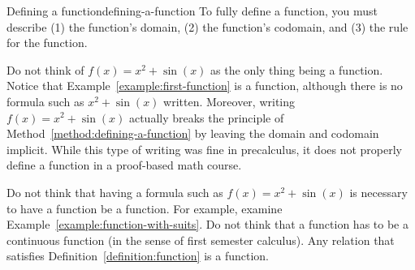 \documentclass{book}
\theoremstyle{ekimcustom}
\begin{document}
\begin{bmethod}{Defining a function}{defining-a-function}
To fully define a function, you must describe (1) the function's domain, (2) the function's codomain, and (3) the rule for the function.
\end{bmethod}
\begin{bwarning}{}{}
Do not think of $f(x)=x^2+\sin(x)$ as the only thing being a function. Notice that Example~\ref{example:first-function} is a function, although there is no formula such as $x^2+\sin(x)$ written. Moreover, writing $f(x)=x^2+\sin(x)$ actually breaks the principle of Method~\ref{method:defining-a-function} by leaving the domain and codomain implicit. While this type of writing was fine in precalculus, it does not properly define a function in a proof-based math course.
\end{bwarning}
\begin{bwarning}{}{}
Do not think that having a formula such as $f(x)=x^2+\sin(x)$ is necessary to have a function be a function. For example, examine Example~\ref{example:function-with-suits}. Do not think that a function has to be a continuous function (in the sense of first semester calculus). Any relation that satisfies Definition~\ref{definition:function} is a function.
\end{bwarning}
\end{document}
